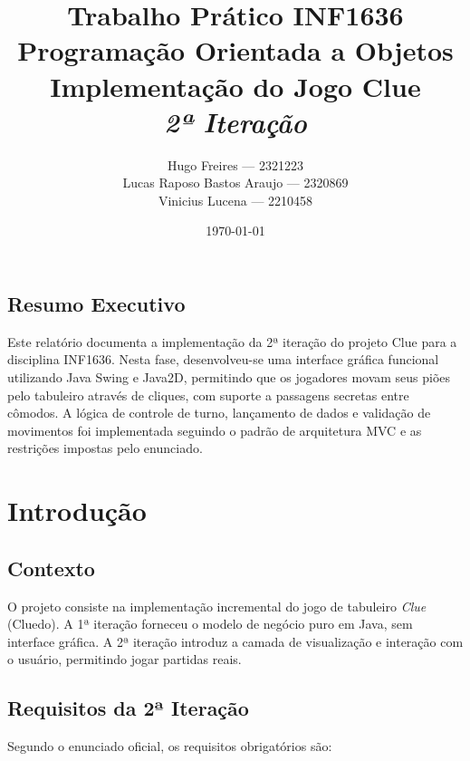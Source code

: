\documentclass[12pt,a4paper]{report}
\title{\Large \textbf{Trabalho Prático INF1636 \\ Programação Orientada a Objetos} \\[0.5cm]
\textbf{Implementação do Jogo Clue} \\[0.3cm]
\textit{2ª Iteração}}
\author{Hugo Freires --- 2321223 \\
Lucas Raposo Bastos Araujo --- 2320869 \\
Vinicius Lucena --- 2210458}
\date{\today}
\begin{document}
\maketitle

\section*{Resumo Executivo}

Este relatório documenta a implementação da 2ª iteração do projeto Clue para a disciplina INF1636. Nesta fase, desenvolveu-se uma interface gráfica funcional utilizando Java Swing e Java2D, permitindo que os jogadores movam seus piões pelo tabuleiro através de cliques, com suporte a passagens secretas entre cômodos. A lógica de controle de turno, lançamento de dados e validação de movimentos foi implementada seguindo o padrão de arquitetura MVC e as restrições impostas pelo enunciado.

\tableofcontents

\chapter{Introdução}

\section{Contexto}

O projeto consiste na implementação incremental do jogo de tabuleiro \textit{Clue} (Cluedo). A 1ª iteração forneceu o modelo de negócio puro em Java, sem interface gráfica. A 2ª iteração introduz a camada de visualização e interação com o usuário, permitindo jogar partidas reais.

\section{Requisitos da 2ª Iteração}

Segundo o enunciado oficial, os requisitos obrigatórios são:
\end{document}
